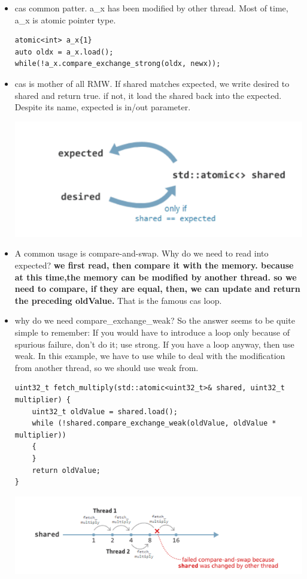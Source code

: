\documentclass[a4paper,11pt,twoside]{book}
\begin{document}
\begin{itemize}
	\item cas common patter. a\_x has been modified by other thread. Most of time, a\_x is atomic pointer type.
\begin{lstlisting}[numbers=none]
atomic<int> a_x{1}
auto oldx = a_x.load();
while(!a_x.compare_exchange_strong(oldx, newx));
\end{lstlisting}
	
		\item cas is mother of all RMW. If shared matches expected, we write desired to shared and return true. if not, it load the shared back into the expected. Despite its name, expected is in/out parameter. 

\begin{center}
	\includegraphics[width=0.50\linewidth]{pics/cas.png}
\end{center}


		\item A common usage is compare-and-swap. Why do we need to read into expected? \textbf{we first read, then compare it with the memory. because at this time,the memory can be modified by another thread. so we need to compare, if they are equal, then, we can update and return the preceding oldValue.} That is the famous cas loop. 

		\item why do we need compare\_exchange\_weak?  So the answer seems to be quite simple to remember: If you would have to introduce a loop only because of spurious failure, don't do it; use strong. If you have a loop anyway, then use weak. In this example, we have to use while to deal with the modification from another thread, so we should use weak from.


\begin{lstlisting}
uint32_t fetch_multiply(std::atomic<uint32_t>& shared, uint32_t multiplier) {
    uint32_t oldValue = shared.load();
    while (!shared.compare_exchange_weak(oldValue, oldValue * multiplier))
    {
    }
    return oldValue;
}
\end{lstlisting}

\begin{center}
	\includegraphics[width=0.85\linewidth]{pics/cas1.png}
\end{center}


\end{itemize}
\end{document}
